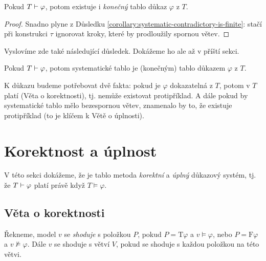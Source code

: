 \begin{corollary}\label{corollary:finiteness-of-proofs}
    Pokud $T\vdash\varphi$, potom existuje i \emph{konečný} tablo důkaz $\varphi$ z $T$.
\end{corollary}
\begin{proof}
Snadno plyne z Důsledku \ref{corollary:systematic-contradictory-is-finite}: stačí při konstrukci $\tau$ ignorovat kroky, které by prodloužily spornou větev.
\end{proof}

Vyslovíme zde také následující důsledek. Dokážeme ho ale až v příští sekci.

\begin{corollary}\label{corollary:systematicity-of-proofs}
    Pokud $T\vdash\varphi$, potom systematické tablo je (konečným) tablo důkazem $\varphi$ z $T$.
\end{corollary}

K důkazu budeme potřebovat dvě fakta: pokud je $\varphi$ dokazatelná z $T$, potom v $T$ platí (Věta o korektnosti), tj. nemůže existovat protipříklad. A dále pokud by systematické tablo mělo bezespornou větev, znamenalo by to, že existuje protipříklad (to je klíčem k Větě o úplnosti).


\section{Korektnost a úplnost}

V této sekci dokážeme, že je tablo metoda \emph{korektní} a \emph{úplný} důkazový systém, tj. že $T\vdash\varphi$ platí právě když $T\models\varphi$.

\subsection{Věta o korektnosti}

Řekneme, model $v$ se \emph{shoduje} s položkou $P$, pokud
$P=\mathrm{T}\varphi$ a $v\models\varphi$, nebo $P=\mathrm{F}\varphi$ a $v\not\models\varphi$. Dále $v$ se shoduje s větví $V$, pokud se shoduje s každou položkou na této větvi.


